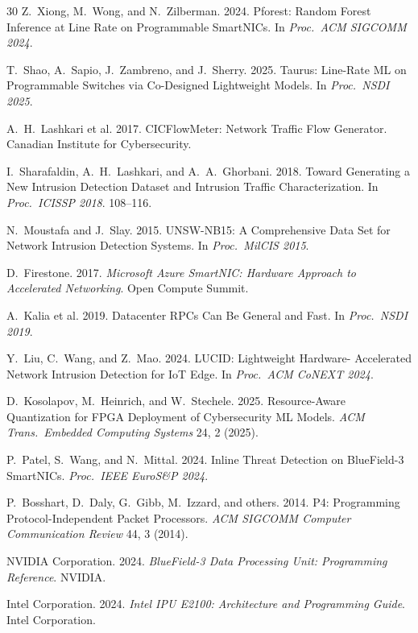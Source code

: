 \documentclass[sigconf,nonacm]{acmart}
\begin{document}
\begin{thebibliography}{30}
Z.~Xiong, M.~Wong, and N.~Zilberman. 2024. Pforest: Random Forest
Inference at Line Rate on Programmable SmartNICs. In
\textit{Proc.\ ACM SIGCOMM 2024}.

T.~Shao, A.~Sapio, J.~Zambreno, and J.~Sherry. 2025. Taurus: Line-Rate
ML on Programmable Switches via Co-Designed Lightweight Models.
In \textit{Proc.\ NSDI 2025}.

A.~H.~Lashkari et al. 2017. CICFlowMeter: Network Traffic Flow
Generator. Canadian Institute for Cybersecurity.

I.~Sharafaldin, A.~H.~Lashkari, and A.~A.~Ghorbani. 2018. Toward
Generating a New Intrusion Detection Dataset and Intrusion Traffic
Characterization. In \textit{Proc.\ ICISSP 2018}. 108--116.

N.~Moustafa and J.~Slay. 2015. UNSW-NB15: A Comprehensive Data Set for
Network Intrusion Detection Systems. In \textit{Proc.\ MilCIS 2015}.

D.~Firestone. 2017. \textit{Microsoft Azure SmartNIC: Hardware Approach
to Accelerated Networking}. Open Compute Summit.

A.~Kalia et al. 2019. Datacenter RPCs Can Be General and Fast.
In \textit{Proc.\ NSDI 2019}.

Y.~Liu, C.~Wang, and Z.~Mao. 2024. LUCID: Lightweight Hardware-
Accelerated Network Intrusion Detection for IoT Edge.
In \textit{Proc.\ ACM CoNEXT 2024}.

D.~Kosolapov, M.~Heinrich, and W.~Stechele. 2025. Resource-Aware
Quantization for FPGA Deployment of Cybersecurity ML Models.
\textit{ACM Trans.\ Embedded Computing Systems} 24, 2 (2025).

P.~Patel, S.~Wang, and N.~Mittal. 2024. Inline Threat Detection on
BlueField-3 SmartNICs. \textit{Proc.\ IEEE EuroS\&P 2024}.

P.~Bosshart, D.~Daly, G.~Gibb, M.~Izzard, and others. 2014. P4:
Programming Protocol-Independent Packet Processors.
\textit{ACM SIGCOMM Computer Communication Review} 44, 3 (2014).

NVIDIA Corporation. 2024. \textit{BlueField-3 Data Processing Unit:
Programming Reference}. NVIDIA.

Intel Corporation. 2024. \textit{Intel IPU E2100: Architecture and
Programming Guide}. Intel Corporation.

\end{thebibliography}
\end{document}
